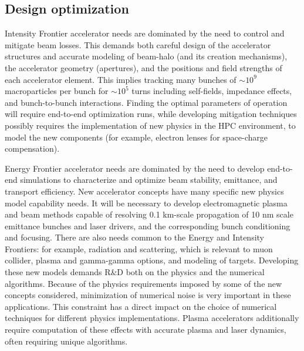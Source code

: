 \subsection{Design optimization}
Intensity Frontier accelerator needs are dominated by the need to
control and mitigate beam losses.  This demands both careful
design of the accelerator structures and accurate modeling of
beam-halo (and its creation mechanisms), the accelerator
geometry (apertures), and the positions and field strengths of each accelerator 
element.  This implies tracking many bunches of $\sim 10^9$
macroparticles per bunch for $\sim 10^5$ turns including
self-fields, impedance effects, and bunch-to-bunch interactions.
Finding the optimal parameters of operation will require
end-to-end  optimization runs, while developing mitigation
techniques possibly requires the implementation of new physics in the HPC
environment, to model the new components (for example, electron
lenses for space-charge compensation). 

Energy Frontier accelerator needs are dominated by the need to
develop end-to-end simulations to characterize and optimize beam
stability, emittance, and transport efficiency.  New
accelerator concepts have many specific new physics model
capability needs. It will be necessary to develop electromagnetic
plasma and beam methods capable of resolving 0.1 km-scale
propagation of 10 nm scale emittance bunches and laser drivers,
and the corresponding bunch conditioning and focusing. 
There are also needs common to the Energy and Intensity Frontiers:
for example, radiation and
scattering, which is relevant to muon collider, plasma and
gamma-gamma options, and modeling of targets.
Developing these new models
demands R\&D both on the physics and the numerical algorithms.
Because of the physics requirements imposed by some of the new
concepts considered, minimization of numerical noise is very
important in these applications.  This constraint has a direct
impact on the choice of numerical techniques for different
physics implementations.  Plasma accelerators additionally require 
computation of these effects with accurate plasma and laser dynamics,
 often requiring unique algorithms.

